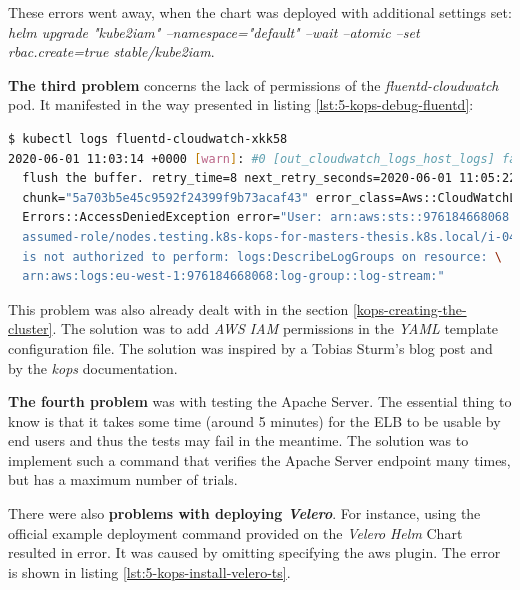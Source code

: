 These errors went away, when the chart was deployed with additional settings set: \textit{helm upgrade "kube2iam" --namespace="default" --wait --atomic --set rbac.create=true stable/kube2iam}.

\textbf{The third problem} concerns the lack of permissions of the \textit{fluentd-cloudwatch} pod. It manifested in the way presented in listing \ref{lst:5-kops-debug-fluentd}:
\begin{lstlisting}[basicstyle=\scriptsize,xleftmargin=0cm,label=lst:5-kops-debug-fluentd,caption={Debugging the \textit{fluent-cloudwatch} pod},captionpos=b,language=Bash,showstringspaces=false]
$ kubectl logs fluentd-cloudwatch-xkk58
2020-06-01 11:03:14 +0000 [warn]: #0 [out_cloudwatch_logs_host_logs] failed to \
  flush the buffer. retry_time=8 next_retry_seconds=2020-06-01 11:05:22 +0000 \
  chunk="5a703b5e45c9592f24399f9b73acaf43" error_class=Aws::CloudWatchLogs::\
  Errors::AccessDeniedException error="User: arn:aws:sts::976184668068:\
  assumed-role/nodes.testing.k8s-kops-for-masters-thesis.k8s.local/i-04a926040234f36d6\
  is not authorized to perform: logs:DescribeLogGroups on resource: \
  arn:aws:logs:eu-west-1:976184668068:log-group::log-stream:"
\end{lstlisting}
This problem was also already dealt with in the section \ref{kops-creating-the-cluster}. The solution was to add \textit{AWS IAM} permissions in the \textit{YAML} template configuration file. The solution was inspired by a Tobias Sturm's blog post \cite{kops-logs-cw-tobias} and by the \textit{kops} documentation\cite{online-kops-iam}.

\textbf{The fourth problem} was with testing the Apache Server. The essential thing to know is that it takes some time (around 5 minutes) for the ELB to be usable by end users and thus the tests may fail in the meantime. The solution was to implement such a command that verifies the Apache Server endpoint many times, but has a maximum number of trials.

There were also \textbf{problems with deploying \textit{Velero}}. For instance, using the official example deployment command provided on the \textit{Velero} \textit{Helm} Chart \cite{velero-helm-chart} resulted in error. It was caused by omitting specifying the aws plugin. The error is shown in listing \ref{lst:5-kops-install-velero-ts}.

